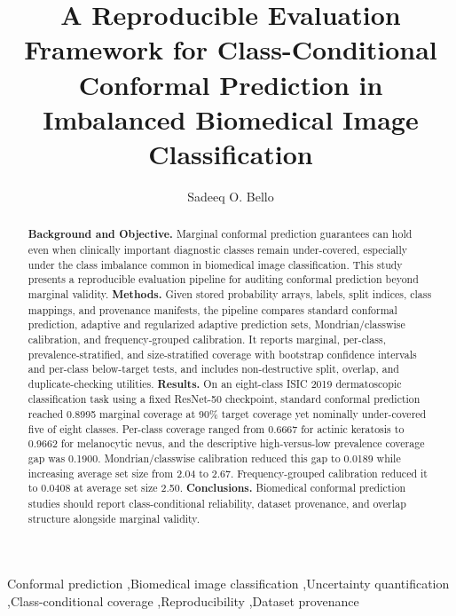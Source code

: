 ﻿\documentclass[preprint,12pt]{elsarticle}
\begin{document}
\begin{frontmatter}

\title{A Reproducible Evaluation Framework for Class-Conditional Conformal Prediction in Imbalanced Biomedical Image Classification}

\author[ufscar]{Sadeeq O. Bello}


\begin{abstract}
\textbf{Background and Objective.} Marginal conformal prediction guarantees can hold even when clinically important diagnostic classes remain under-covered, especially under the class imbalance common in biomedical image classification. This study presents a reproducible evaluation pipeline for auditing conformal prediction beyond marginal validity.
\textbf{Methods.} Given stored probability arrays, labels, split indices, class mappings, and provenance manifests, the pipeline compares standard conformal prediction, adaptive and regularized adaptive prediction sets, Mondrian/classwise calibration, and frequency-grouped calibration. It reports marginal, per-class, prevalence-stratified, and size-stratified coverage with bootstrap confidence intervals and per-class below-target tests, and includes non-destructive split, overlap, and duplicate-checking utilities.
\textbf{Results.} On an eight-class ISIC 2019 dermatoscopic classification task using a fixed ResNet-50 checkpoint, standard conformal prediction reached 0.8995 marginal coverage at 90\% target coverage yet nominally under-covered five of eight classes. Per-class coverage ranged from 0.6667 for actinic keratosis to 0.9662 for melanocytic nevus, and the descriptive high-versus-low prevalence coverage gap was 0.1900. Mondrian/classwise calibration reduced this gap to 0.0189 while increasing average set size from 2.04 to 2.67. Frequency-grouped calibration reduced it to 0.0408 at average set size 2.50.
\textbf{Conclusions.} Biomedical conformal prediction studies should report class-conditional reliability, dataset provenance, and overlap structure alongside marginal validity.
\end{abstract}


\begin{keyword}
Conformal prediction \sep Biomedical image classification \sep Uncertainty quantification \sep Class-conditional coverage \sep Reproducibility \sep Dataset provenance
\end{keyword}

\end{frontmatter}
\end{document}
